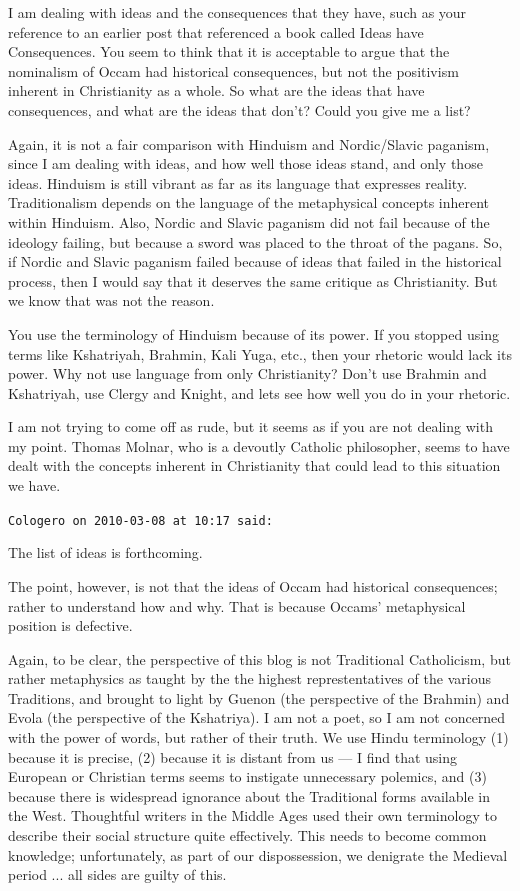 \begin{footnotesize}
\begin{sffamily}
I am dealing with ideas and the consequences that they have, such as your reference to an earlier post that referenced a book called Ideas have Consequences. You seem to think that it is acceptable to argue that the nominalism of Occam had historical consequences, but not the positivism inherent in Christianity as a whole. So what are the ideas that have consequences, and what are the ideas that don't? Could you give me a list?

Again, it is not a fair comparison with Hinduism and Nordic/Slavic paganism, since I am dealing with ideas, and how well those ideas stand, and only those ideas. Hinduism is still vibrant as far as its language that expresses reality. Traditionalism depends on the language of the metaphysical concepts inherent within Hinduism. Also, Nordic and Slavic paganism did not fail because of the ideology failing, but because a sword was placed to the throat of the pagans. So, if Nordic and Slavic paganism failed because of ideas that failed in the historical process, then I would say that it deserves the same critique as Christianity. But we know that was not the reason.

You use the terminology of Hinduism because of its power. If you stopped using terms like Kshatriyah, Brahmin, Kali Yuga, etc., then your rhetoric would lack its power. Why not use language from only Christianity? Don't use Brahmin and Kshatriyah, use Clergy and Knight, and lets see how well you do in your rhetoric.

I am not trying to come off as rude, but it seems as if you are not dealing with my point. Thomas Molnar, who is a devoutly Catholic philosopher, seems to have dealt with the concepts inherent in Christianity that could lead to this situation we have.

\hfill

\texttt{Cologero on 2010-03-08 at 10:17 said:}

The list of ideas is forthcoming.

The point, however, is not that the ideas of Occam had historical consequences; rather to understand how and why. That is because Occams' metaphysical position is defective.

Again, to be clear, the perspective of this blog is not Traditional Catholicism, but rather metaphysics as taught by the the highest represtentatives of the various Traditions, and brought to light by Guenon (the perspective of the Brahmin) and Evola (the perspective of the Kshatriya). I am not a poet, so I am not concerned with the power of words, but rather of their truth. We use Hindu terminology (1) because it is precise, (2) because it is distant from us --- I find that using European or Christian terms seems to instigate unnecessary polemics, and (3) because there is widespread ignorance about the Traditional forms available in the West. Thoughtful writers in the Middle Ages used their own terminology to describe their social structure quite effectively. This needs to become common knowledge; unfortunately, as part of our dispossession, we denigrate the Medieval period ... all sides are guilty of this.


\end{sffamily}
\end{footnotesize}
